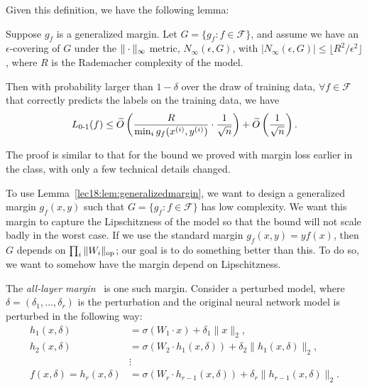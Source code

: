 Given this definition, we have the following lemma:
\begin{lemma}
\label{lec18:lem:generalizedmargin}
Suppose $g_f$ is a generalized margin. Let $G = \{ g_f : f \in \mathcal{F} \}$, and assume we have an $\epsilon$-covering of $G$ under the $\|\cdot\|_\infty$ metric, $N_{\infty} (\epsilon, G)$, with $|N_{\infty} (\epsilon, G)|  \le \lfloor R^2 / \epsilon^2 \rfloor$, where $R$ is the Rademacher complexity of the model.

Then with probability larger than $1 - \delta$ over the draw of training data, $\forall f \in \mathcal{F}$ that correctly predicts the labels on the training data, we have
\begin{align}
    L_{\textup{0-1}} (f) \le \widetilde{O} \left( \frac{R}{\min_i g_f(x^{(i)}, y^{(i)})} \cdot \frac{1}{\sqrt{n}} \right) + \widetilde{O} \left(\frac{1}{\sqrt{n}} \right).
\end{align}
\end{lemma}

The proof is similar to that for the bound we proved with margin loss earlier in the class, with only a few technical details changed.


To use Lemma~\ref{lec18:lem:generalizedmargin}, we want to design a generalized margin $g_f(x, y)$ such that $G = \{ g_f : f \in \mathcal{F} \}$ has low complexity. We want this margin to capture the Lipschitzness of the model so that the bound will not scale badly in the worst case. If we use the standard margin $g_f(x, y) = yf(x)$, then $G$ depends on $\prod_i \| W_i \|_{\textup{op}}$; our goal is to do something better than this. To do so, we want to somehow have the margin depend on Lipschitzness.

The \textit{all-layer margin}~\cite{wei2019improved} is one such margin. Consider a perturbed model, where $\delta = (\delta_1, ..., \delta_r)$ is the perturbation and the original neural network model is perturbed in the following way:
\begin{align}
    h_1(x, \delta) &= \sigma(W_1 \cdot x) + \delta_1 \| x \|_2, \\
    h_2(x, \delta) &= \sigma(W_2 \cdot h_1(x, \delta)) + \delta_2 \|h_1(x, \delta) \|_2, \\
    &\vdots \nonumber \\
    f(x, \delta) = h_r(x, \delta) &= \sigma(W_r \cdot h_{r-1}(x, \delta)) + \delta_r \|h_{r-1}(x, \delta) \|_2.
\end{align}

